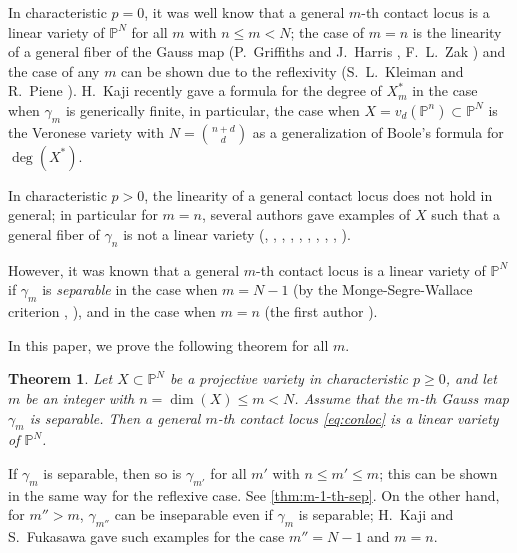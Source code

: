 \documentclass[a4paper,12pt]{amsart}
\theoremstyle{plain}
\newtheorem{thm}{Theorem}[section]
\theoremstyle{definition}
\begin{document}
In characteristic $p=0$,
it was well know that a general $m$-th contact locus is a linear variety of ${{\mathbb{P}}^N}$
for all $m$ with $n {\leqslant} m < N$;
the case of $m = n$ is the linearity of a general fiber of the Gauss map (P.~Griffiths and J.~Harris \cite[(2.10)]{GH}, F.~L.~Zak \cite[I, 2.3.~Theorem~(c)]{Zak})
and the case of any $m$ can be shown due to the reflexivity (S.~L.~Kleiman and R.~Piene \cite[pp.~108--109]{KP}).
H.~Kaji \cite{Kaji15} recently gave a formula for the degree of $X_m^*$ in the case when $\gamma_m$ is generically finite, in particular, the case when $X = v_d({\mathbb{P}}^n) \subset {{\mathbb{P}}^N}$ is the Veronese variety with $N = \binom{n+d}{d}$ as a generalization of Boole's formula for $\deg(X^*)$.

In characteristic $p > 0$,
the linearity of a general contact locus does not hold in general;
in particular for $m=n$, several authors gave examples of $X$
such that a general fiber of $\gamma_n$ is not a linear variety
(\cite[]{Wallace}, \cite[I-3]{Kleiman1986},
\cite[Example~4.1]{Kaji1986}, \cite{Kaji1989}, \cite[Example~2.13]{Rathmann}, \cite{Noma2001},
\cite[\textsection{}7]{Fukasawa2005}, \cite{Fukasawa2006}, \cite[\textsection{}5]{gmaptoric}, \cite[Theorem~1.3]{FI}).

However, it was known that a general $m$-th contact locus is a linear variety of ${{\mathbb{P}}^N}$
if $\gamma_m$ is \emph{separable}
in the case when $m = N-1$ (by the Monge-Segre-Wallace criterion \cite[(2.4)]{HK}, \cite[I-1(4)]{Kleiman1986}),
and in the case when $m = n$ (the first author \cite{expshr}).

In this paper, we prove the following theorem for all $m$.

\begin{thm}\label{thm:m-th-linearity}
  Let $X \subset {{\mathbb{P}}^N}$ be a projective variety
  in characteristic $p {\geqslant} 0$,
  and let $m$ be an integer with $n = \dim(X) {\leqslant} m < N$.
  Assume that the $m$-th Gauss map $\gamma_m$ is separable.
  Then a general $m$-th contact locus \autoref{eq:conloc} is a linear variety of ${{\mathbb{P}}^N}$.
\end{thm}

If $\gamma_m$ is separable, then
so is $\gamma_{m'}$ for all $m'$ with $n {\leqslant} m' {\leqslant} m$;
this can be shown in the same way for the reflexive case.
See \autoref{thm:m-1-th-sep}.
On the other hand, for $m'' > m$,
$\gamma_{m''}$ can be inseparable even if $\gamma_m$ is separable;
H.~Kaji \cite{Kaji2003} and S.~Fukasawa \cite{Fukasawa2006-3} \cite{Fukasawa2007}
gave such examples for the case $m'' = N-1$ and $m = n$.
\\
\end{document}
